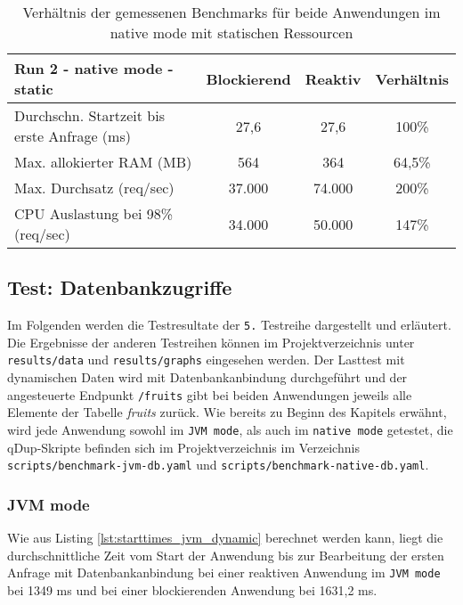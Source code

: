 \begin{table}[ht!]
    \begin{tabular}{|l | c | c | c|}
        \hline
        Run 2 - native mode - static & Blockierend & Reaktiv & Verhältnis \\
        \hline
        \makecell[l]{Durchschn. Startzeit bis                             \\erste Anfrage (ms)} &   27,6    &  27,6  &   100\%   \\
        \hline
        Max. allokierter RAM (MB)    & 564         & 364     & 64,5\%     \\
        \hline
        Max. Durchsatz (req/sec)     & 37.000      & 74.000  & 200\%      \\
        \hline
        \makecell[l]{CPU Auslastung bei 98\%                              \\ (req/sec)} & 34.000 & 50.000 & 147\%  \\
        \hline
    \end{tabular}
    \caption{Verhältnis der gemessenen Benchmarks für beide Anwendungen im native mode mit statischen Ressourcen}
    \label{table:static_native_measurement_results}
\end{table}
\newpage
\subsection{Test: Datenbankzugriffe}
\label{section:datenbankzugriffe}
Im Folgenden werden die Testresultate der \verb|5.| Testreihe dargestellt und erläutert.
Die Ergebnisse der anderen Testreihen können im Projektverzeichnis unter \verb|results/data| und \verb|results/graphs| eingesehen werden.
Der Lasttest mit dynamischen Daten wird mit Datenbankanbindung durchgeführt und der angesteuerte Endpunkt \verb|/fruits| gibt bei beiden Anwendungen
jeweils alle Elemente der Tabelle \textit{fruits} zurück. Wie bereits zu Beginn des Kapitels erwähnt, wird jede Anwendung sowohl im \verb|JVM mode|, als auch im
\verb|native mode| getestet, die qDup-Skripte befinden sich im Projektverzeichnis im Verzeichnis \verb|scripts/benchmark-jvm-db.yaml| und
\verb|scripts/benchmark-native-db.yaml|.

\subsubsection{JVM mode}
\label{subsubsec:dynamic_jvm_mode}
Wie aus Listing \ref{lst:starttimes_jvm_dynamic} berechnet werden kann, liegt die durchschnittliche Zeit vom Start der Anwendung bis zur
Bearbeitung der ersten Anfrage mit Datenbankanbindung bei einer reaktiven Anwendung im \verb|JVM mode| bei 1349 ms und bei einer
blockierenden Anwendung bei 1631,2 ms.

